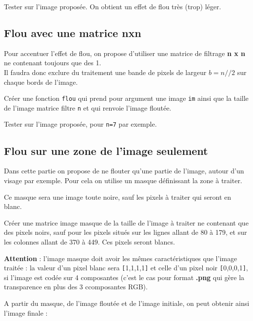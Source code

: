 \begin{question}
Tester sur l'image proposée. On obtient un effet de flou très (trop) léger.
\end{question}

\subsection*{Flou avec une matrice nxn}
Pour accentuer l'effet de flou, on propose d'utiliser une matrice de filtrage \textbf{n x n} ne contenant toujours que des 1.\\
Il faudra donc exclure du traitement une bande de pixels de largeur $b=n//2$ sur chaque bords de l'image.

\begin{question}
Créer une fonction \texttt{flou} qui prend pour argument une image \texttt{im} ainsi que la taille de l'image matrice filtre \texttt{n} et qui renvoie l'image floutée.
\end{question}

\begin{question}
Tester sur l'image proposée, pour \texttt{n=7} par exemple.
\end{question}


\subsection*{Flou sur une zone de l'image seulement}
Dans cette partie on propose de ne flouter qu'une partie de l'image, autour d'un visage par exemple. Pour cela on utilise un masque définissant la zone à traiter.

Ce masque sera une image toute noire, sauf les pixels à traiter qui seront en blanc.

\begin{question}
Créer une matrice image masque de la taille de l'image à traiter ne contenant que des pixels noirs, sauf pour les pixels situés sur les lignes allant de 80 à 179, et sur les colonnes allant de 370  à 449. Ces pixels seront blancs.
\end{question}

\textbf{Attention} : l'image masque doit avoir les mêmes caractéristiques que l'image traitée : la valeur d'un pixel blanc sera \verb![!1,1,1,1\verb!]! et celle d'un pixel noir \verb![!0,0,0,1\verb!]!, si l'image est codée sur 4 composantes (c'est le cas pour format \textbf{.png} qui gère la transparence en plus des 3 ccomposantes RGB).

A partir du masque, de l'image floutée et de l'image initiale, on peut obtenir ainsi l'image finale :

